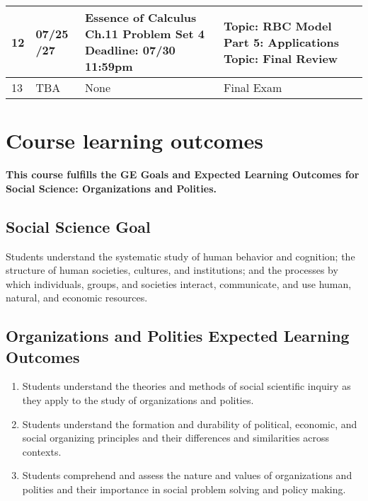 \documentclass[12pt]{article}
\begin{document}
\begin{tabular}{|p{\bb}|p{\qq}|p{\rr}|p{\pp}|}
        12
        &
        07/25
        \newline
        07/27
        &
        Essence of Calculus Ch.11
        \newline
        Problem Set 4
        \newline
        Deadline: 07/30 11:59pm
        &
        Topic: RBC Model Part 5: Applications
        \newline
        Topic: Final Review
    \\
    \hline
        13
        &
        TBA
        &
        None
        &
        Final Exam
    \\
    \hline
\end{tabular}



\newpage

\section*{Course learning outcomes}

\textbf{This course fulfills the GE Goals and Expected Learning Outcomes for Social Science: Organizations and Polities.}

\subsection*{Social Science Goal}

Students understand the systematic study of human behavior and cognition; the structure of human societies, cultures, and institutions; and the processes by which individuals, groups, and societies interact, communicate, and use human, natural, and economic resources.

\subsection*{Organizations and Polities Expected Learning Outcomes}
\begin{enumerate}
    \item Students understand the theories and methods of social scientific inquiry as they apply to the study of organizations and polities.
    \item Students understand the formation and durability of political, economic, and social organizing principles and their differences and similarities across contexts.
    \item Students comprehend and assess the nature and values of organizations and polities and their importance in social problem solving and policy making.
\end{enumerate}
\end{document}
